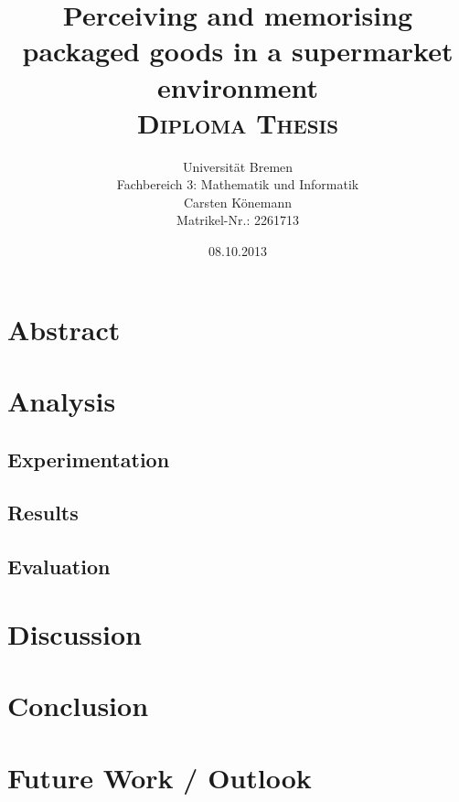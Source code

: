\documentclass[11pt, twoside, a4paper]{report}
\begin{document}
\title{\textbf{Perceiving and memorising packaged goods in a supermarket environment} \vspace{7.5mm} \\ \textsc{Diploma Thesis}}
\author{Universit\"at Bremen \\ Fachbereich 3: Mathematik und Informatik \vspace{3.5mm} \\ Carsten K\"onemann \\ Matrikel-Nr.: 2261713}
\date{08.10.2013}

\maketitle

\chapter*{Abstract}


\tableofcontents








\chapter{Analysis}
\section{Experimentation}
\section{Results}
\section{Evaluation}


\chapter{Discussion}


\chapter{Conclusion}


\chapter{Future Work / Outlook}
\end{document}
